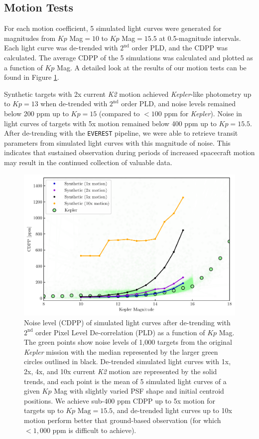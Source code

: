 \documentclass[12pt,preprint]{aastex}
\begin{document}
\subsection{Motion Tests}

For each motion coefficient, 5 simulated light curves were generated for magnitudes from $Kp$ Mag$=10$ to $Kp$ Mag$=15.5$ at 0.5-magnitude intervals. Each light curve was de-trended with $2^{\text{nd}}$ order PLD, and the CDPP was calculated. The average CDPP of the 5 simulations was calculated and plotted as a function of $Kp$ Mag. A detailed look at the results of our motion tests can be found in Figure \ref{fig:detmotion}.

Synthetic targets with 2x current \textit{K2} motion achieved \textit{Kepler}-like photometry up to $Kp = 13$ when de-trended with $2^{\text{nd}}$ order PLD, and noise levels remained below 200 ppm up to $Kp = 15$ (compared to $<100$ ppm for \textit{Kepler}). Noise in light curves of targets with 5x motion remained below 400 ppm up to $Kp = 15.5$. After de-trending with the \texttt{EVEREST} pipeline, we were able to retrieve transit parameters from simulated light curves with this magnitude of noise. This indicates that sustained observation during periods of increased spacecraft motion may result in the continued collection of valuable data.

\begin{figure}[h]
	\centering
	\includegraphics[width=1.0\linewidth]{detrend_test.pdf}
	\caption{Noise level (CDPP) of simulated light curves after de-trending with $2^{\text{nd}}$ order Pixel Level De-correlation (PLD) as a function of $Kp$ Mag. The green points show noise levels of 1,000 targets from the original \textit{Kepler} mission with the median represented by the larger green circles outlined in black. De-trended simulated light curves with 1x, 2x, 4x, and 10x current \textit{K2} motion are represented by the solid trends, and each point is the mean of 5 simulated light curves of a given $Kp$ Mag with slightly varied PSF shape and initial centroid positions. We achieve sub-400 ppm CDPP up to 5x motion for targets up to $Kp \text{ Mag}=15.5$, and de-trended light curves up to 10x motion perform better that ground-based observation (for which $<1,000$ ppm is difficult to achieve).}
	\label{fig:detmotion}
\end{figure}
\end{document}
